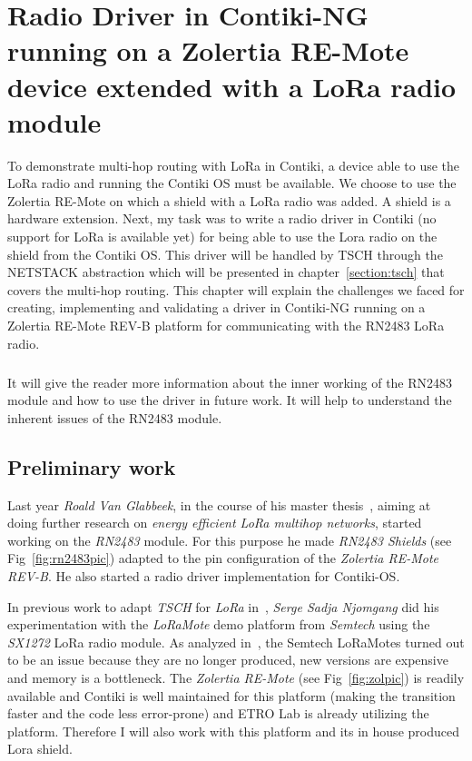 \chapter{Radio Driver in Contiki-NG running on a Zolertia RE-Mote device extended with a LoRa radio module\label{section:radio}}

To demonstrate multi-hop routing with LoRa in Contiki, a device able to use
the LoRa radio and running the Contiki OS must be available.
We choose to use the Zolertia RE-Mote on which a shield with a LoRa radio was
added. A shield is a hardware extension.
Next, my task was to write a radio driver in Contiki (no support for LoRa is available yet)
for being able to use the Lora radio on the shield from the Contiki OS.
This driver will be handled by TSCH through the NETSTACK abstraction
which will be presented in chapter~\ref{section:tsch} that covers the multi-hop routing.
This chapter will explain the challenges we faced for creating, implementing
and validating a driver in Contiki-NG running on a Zolertia RE-Mote REV-B
platform for communicating with the RN2483 LoRa radio.

\paragraph{}

It will give the reader more information about the inner working of
the RN2483 module and how to use the driver in future work.
It will help to understand the inherent issues of the RN2483 module.

\section{Preliminary work}

Last year \emph{Roald Van Glabbeek}, in the course of his master thesis~\cite{8847137},
aiming at doing further research on \emph{energy efficient LoRa multihop networks},
started working on the \emph{RN2483} module.
For this purpose he made \emph{RN2483 Shields} (see Fig~\ref{fig:rn2483pic}) adapted to the pin
configuration of the \emph{Zolertia RE-Mote REV-B}. He also started a radio driver
implementation for Contiki-OS\@.

In previous work to adapt \emph{TSCH} for \emph{LoRa}
in~\cite{njomgang_2018}, \emph{Serge Sadja Njomgang} did his experimentation with
the \emph{LoRaMote} demo platform from \emph{Semtech} using the \emph{SX1272} LoRa
radio module.
As analyzed in~\cite{8847137}, the Semtech LoRaMotes turned out to be an issue
because they are no longer produced, new versions are expensive and memory is
a bottleneck.
The \emph{Zolertia RE-Mote} (see Fig~\ref{fig:zolpic}) is readily available and
Contiki is well maintained for this platform (making the transition faster and
the code less error-prone) and ETRO Lab is already utilizing the platform.
Therefore I will also work with this platform and its in house produced Lora shield.

